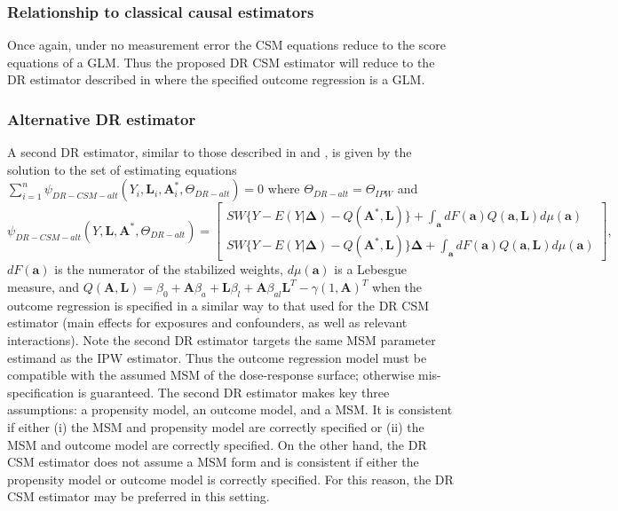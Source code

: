 \documentclass[12pt]{article}
\begin{document}
\subsubsection{Relationship to classical causal estimators}

Once again, under no measurement error the CSM equations reduce to the score equations of a GLM. Thus the proposed DR CSM estimator will reduce to the DR estimator described in \citet{hirano2001} where the specified outcome regression is a GLM.

\subsubsection{Alternative DR estimator}

A second DR estimator, similar to those described in \citet{robins2000b} and \citet{neugebauer2005}, is given by the solution to the set of estimating equations \newline $\sum_{i=1}^{n} \psi_{DR-CSM-alt}(Y_{i}, \bm{L}_{i}, \bm{A}^{*}_{i}, \Theta_{DR-alt}) = 0$ where $\Theta_{DR-alt} = \Theta_{IPW}$ and
\begin{equation*}
    \psi_{DR-CSM-alt}(Y, \bm{L}, \bm{A}^{*}, \Theta_{DR-alt}) =
    \begin{bmatrix}
       SW \{ Y - E(Y | \bm{\Delta}) - Q(\bm{A}^{*}, \bm{L}) \} + \int_{\bm{a}} dF(\bm{a})Q(\bm{a}, \bm{L})d\mu (\bm{a}) \\
       SW \{ Y - E(Y | \bm{\Delta}) - Q(\bm{A}^{*}, \bm{L}) \} \bm{\Delta} + \int_{\bm{a}} dF(\bm{a})Q(\bm{a}, \bm{L})d\mu (\bm{a})
    \end{bmatrix},
\end{equation*}
$dF(\bm{a})$ is the numerator of the stabilized weights, $d\mu (\bm{a})$ is a Lebesgue measure, and $Q(\bm{A}, \bm{L}) = \beta_{0} + \bm{A} \beta_{a} + \bm{L} \beta_{l} + \bm{A} \beta_{al}\bm{L}^{T} - \gamma (1, \bm{A})^{T}$ when the outcome regression is specified in a similar way to that used for the DR CSM estimator (main effects for exposures and confounders, as well as relevant interactions). Note the second DR estimator targets the same MSM parameter estimand as the IPW estimator. Thus the outcome regression model must be compatible with the assumed MSM of the dose-response surface; otherwise mis-specification is guaranteed. The second DR estimator makes key three assumptions: a propensity model, an outcome model, and a MSM. It is consistent if either (i) the MSM and propensity model are correctly specified or (ii) the MSM and outcome model are correctly specified. On the other hand, the DR CSM estimator does not assume a MSM form and is consistent if either the propensity model or outcome model is correctly specified. For this reason, the DR CSM estimator may be preferred in this setting.
\end{document}
